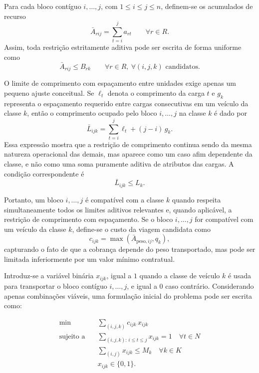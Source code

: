 Para cada bloco contíguo \(i,\dots,j\), com \(1 \le i \le j \le n\), definem-se
os acumulados de recurso
{
\everymath{\normalcolor}
\[
\bar{A}_{rij} = \sum_{t=i}^{j} a_{rt}
\qquad \forall r \in R.
\]
}
Assim, toda restrição estritamente aditiva pode ser escrita de forma uniforme
como
{
\everymath{\normalcolor}
\[
\bar{A}_{rij} \le B_{rk}
\qquad \forall r \in R,\ \forall (i,j,k) \text{ candidatos}.
\]
}

O limite de comprimento com espaçamento entre unidades exige apenas um pequeno
ajuste conceitual. Se \(\ell_t\) denota o comprimento da carga \(t\) e
\(g_k\) representa o espaçamento requerido entre cargas consecutivas em um
veículo da classe \(k\), então o comprimento ocupado pelo bloco \(i,\dots,j\)
na classe \(k\) é dado por
{
\everymath{\normalcolor}
\[
\bar{L}_{ijk}
= \sum_{t=i}^{j} \ell_t + (j-i)\, g_k.
\]
}
Essa expressão mostra que a restrição de comprimento continua sendo da mesma
natureza operacional das demais, mas aparece como um caso afim dependente da
classe, e não como uma soma puramente aditiva de atributos das cargas. A
condição correspondente é
{
\everymath{\normalcolor}
\[
\bar{L}_{ijk} \le L_k.
\]
}

Portanto, um bloco \(i,\dots,j\) é compatível com a classe \(k\) quando respeita
simultaneamente todos os limites aditivos relevantes e, quando aplicável, a
restrição de comprimento com espaçamento. Se o bloco \(i,\dots,j\) for
compatível com um veículo da classe \(k\), define-se o custo da viagem
candidata como
{
\everymath{\normalcolor}
\[
c_{ijk} = \max(\bar{A}_{\text{peso},ij}, q_k),
\]
}
capturando o fato de que a cobrança depende do peso transportado, mas pode ser
limitada inferiormente por um valor mínimo contratual.

Introduz-se a variável binária \(x_{ijk}\), igual a \(1\) quando a classe de
veículo \(k\) é usada para transportar o bloco contíguo \(i,\dots,j\), e igual a
 \(0\) caso contrário. Considerando apenas combinações viáveis, uma formulação
inicial do problema pode ser escrita como:

{
\everymath{\normalcolor}
\begin{align*}
\min \quad & \sum_{(i,j,k)} c_{ijk}\, x_{ijk} \\
\text{sujeito a} \quad
& \sum_{(i,j,k):\, i \le t \le j} x_{ijk} = 1
\quad \forall t \in N \\
& \sum_{(i,j)} x_{ijk} \le M_k
\quad \forall k \in K \\
& x_{ijk} \in \{0,1\}.
\end{align*}
}

